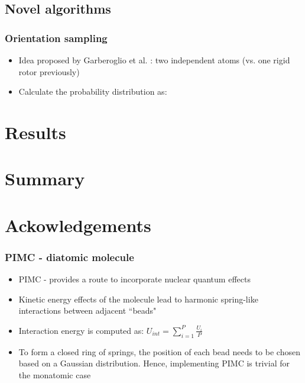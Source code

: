 \documentclass[xcolor=svgnames]{beamer}
\begin{document}
        \subsection{Novel algorithms}
        \begin{frame}
            \frametitle{Orientation sampling}
            \begin{itemize}
                \item Idea proposed by Garberoglio et al. \cite{Garberoglio2014}: two independent atoms (vs. one rigid rotor previously)
                \item Calculate the probability distribution as:

            \end{itemize}
        \end{frame}

	\section{Results}
	\section{Summary}
	\section*{Ackowledgements}

	\begin{frame}
	\frametitle{PIMC - diatomic molecule}
	\begin{itemize}
	\justifying
	\item PIMC - provides a route to incorporate nuclear quantum effects
	\item Kinetic energy effects of the molecule lead to harmonic spring-like interactions between adjacent ``beads"
	\begin{figure}
	\centering
	\def\svgscale{0.3}
	
	\end{figure}
	\item Interaction energy is computed as: $U_{int} = \displaystyle\sum\limits_{i=1}^P \frac{U_i}{P}$
	\begin{figure}
	\centering
	\def\svgscale{0.3}
	
	\end{figure}
	\item To form a closed ring of springs, the position of each bead needs to be chosen based on a Gaussian distribution. Hence, implementing PIMC is trivial for the monatomic case
	\end{itemize}
	\end{frame}
	
\end{document}
